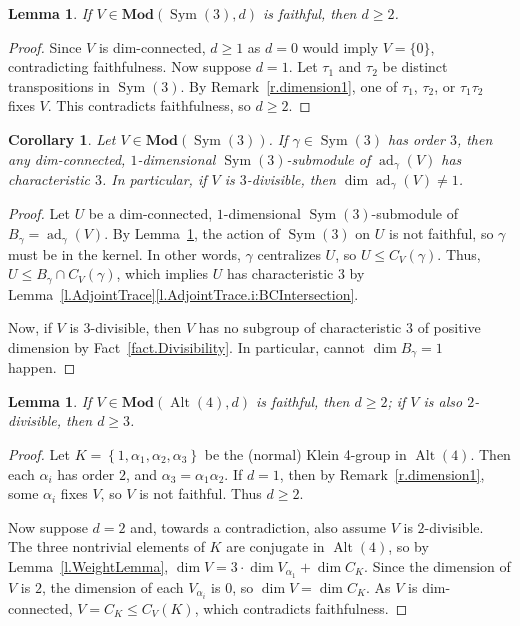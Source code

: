 \documentclass[a4paper, 11pt]{amsart}
\theoremstyle{plain}
\newtheorem{corollary}[theorem]{Corollary}
\newtheorem{lemma}[theorem]{Lemma}
\theoremstyle{definition}
\theoremstyle{remark}
\DeclareMathOperator{\ad}{ad}
\DeclareMathOperator{\Sym}{Sym}
\DeclareMathOperator{\Alt}{Alt}
\newcommand{\Mod}{\mathbf{Mod}}
\begin{document}
\begin{lemma}\label{l.Sym3}
If $V \in \Mod(\Sym(3), d)$ is faithful, then $d \ge 2$. 
\end{lemma}
\begin{proof}
Since $V$ is dim-connected, $d\ge 1$ as $d=0$ would imply $V=\{0\}$, contradicting faithfulness. Now suppose $d=1$. Let $\tau_1$ and $\tau_2$ be distinct transpositions in $\Sym(3)$. By Remark~\ref{r.dimension1}, one of $\tau_1$, $\tau_2$, or $\tau_1\tau_2$ fixes $V$. This contradicts faithfulness, so $d \ge 2$.
\end{proof}



\begin{corollary}\label{c.Bgamma}
Let $V \in \Mod(\Sym(3))$. If $\gamma \in \Sym(3)$ has order $3$, then any dim-connected, $1$-dimensional $\Sym(3)$-submodule of $\ad_\gamma(V)$ has characteristic $3$. In particular, if $V$ is $3$-divisible, then $\dim \ad_\gamma(V) \neq 1$.
\end{corollary}
\begin{proof}
Let $U$ be a dim-connected, $1$-dimensional $\Sym(3)$-submodule of $B_\gamma = \ad_\gamma(V)$.
By Lemma~\ref{l.Sym3}, the action of $\Sym(3)$ on $U$ is not faithful, so $\gamma$ must be in the kernel. In other words, $\gamma$ centralizes  $U$, so $U \le  C_V(\gamma)$. Thus,  $U\le B_\gamma \cap C_V(\gamma)$, which implies $U$ has characteristic $3$ by Lemma~\ref{l.AdjointTrace}\eqref{l.AdjointTrace.i:BCIntersection}.
 
Now, if $V$ is $3$-divisible, then $V$ has no subgroup of characteristic  $3$ of positive dimension by Fact~\ref{fact.Divisibility}.
In particular, cannot $\dim B_\gamma = 1$ happen.
\end{proof}

\begin{lemma}\label{l.Alt4}
If $V \in \Mod(\Alt(4), d)$ is faithful, then $d \ge 2$;  if $V$ is also $2$-divisible, then $d \ge 3$. 
\end{lemma}
\begin{proof}
Let $K = \left\{1, \alpha_{1},\alpha_{2},\alpha_{3}\right\}$ be the (normal) Klein 4-group in $\Alt(4)$. Then each $\alpha_i$ has order $2$, and $\alpha_{3} = \alpha_{1}\alpha_{2}$. If $d=1$, then by Remark~\ref{r.dimension1}, some $\alpha_i$ fixes $V$, so $V$ is not faithful. Thus $d\ge 2$.

Now suppose $d=2$ and, towards a contradiction, also assume $V$ is $2$-divisible. The three nontrivial elements of $K$ are conjugate in $\Alt(4)$, so
by Lemma~\ref{l.WeightLemma}, $\dim V=3\cdot\dim V_{\alpha_{1}}+\dim C_{K}$. Since the dimension of $V$ is $2$, the dimension of each  $V_{\alpha_{i}}$ is $0$, so  $\dim V = \dim C_{K}$. As $V$ is dim-connected, $V=C_K \le C_V(K)$, which contradicts faithfulness.
\end{proof}
\end{document}
